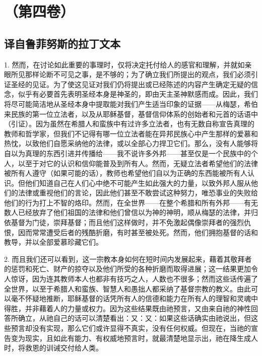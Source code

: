 
\section{（第四卷）}


\subsection{译自鲁菲努斯的拉丁文本}

1. 然而，在讨论如此重要的事理时，仅将决定托付给人的感官和理解，并就如亲眼所见那样论断不可见之事，是不够的；为了确立我们所提出的观点，我们必须引证圣经的见证。为了使这见证对我们仍将提出或已经陈述的内容产生确定无疑的信念，似乎有必要首先表明圣经本身是神圣的，即由天主圣神默感而成。因此，我们将尽可能简洁地从圣经本身中提取能对我们产生适当印象的证据——从梅瑟，希伯来民族的第一位立法者，以及从耶稣基督，基督信仰体系的创始者和元首的话语中（引证）。因为虽然在希腊人和蛮族中有过许多立法者，也有无数自称宣告真理的教师和哲学家，但我们不记得有哪一位立法者能在异邦民族心中产生那样的爱慕和热忱，以致他们自愿采纳他的法律，或以全部心力捍卫它们。那么，没有人能够将自以为真理的东西引进并传播给——我不说许多外邦——甚至仅是一个民族中的个人，以至于对它的认识和信仰能普及到所有人。然而，无疑立法者希望他们的法律被所有人遵守（如果可能的话），教师也希望他们自以为正确的东西能被所有人认识。但他们知道自己在人们心中绝不可能产生如此强大的力量，以致外邦人服从他们的法律或重视他们的言论，因此他们甚至不敢尝试这种努力，唯恐事业的失败给他们的行为打上不智的烙印。然而，在全世界——在整个希腊和所有外邦——有无数人已经放弃了他们祖国的法律和他们曾信以为神的神明，顺从梅瑟的法律，并归依基督为门徒，崇拜基督；而且他们这样做时，并不免激起偶像崇拜者的强烈仇恨，因而常常遭受后者的残酷折磨，有时甚至被处死。然而，他们拥抱基督的话和教导，并以全部爱慕珍藏它们。\par

2. 而且我们还可以看到，这一宗教本身如何在短时间内发展起来，藉着其敬拜者的惩罚和死亡、财产的掠夺以及他们所受的各种折磨而取得进展；这一结果更加令人惊讶，因为连其教师本人也都非有技巧之人，人数也不很多；然而这些话传遍了全世界，以至于希腊人和蛮族、智慧人和愚拙人都采纳了基督宗教的教义。由此可以毫不怀疑地推断，耶稣基督的话凭所有人的信德和能力在所有人的理智和灵魂中得胜，并非藉着人的力量或权力。因为这些结果既由祂预言，又由来自祂的神性回答所确立，从祂自己的话可以清楚看出：又：又：如果这些话确实由祂说出，但这些预言却没有实现，那么它们或许显得不真实，没有任何权威。但现在，当祂的宣告变为现实，且如此有能力、有权威地预言时，就最清楚地显示出，祂在降生成人时，将救恩的训诫交付给人类。\par

